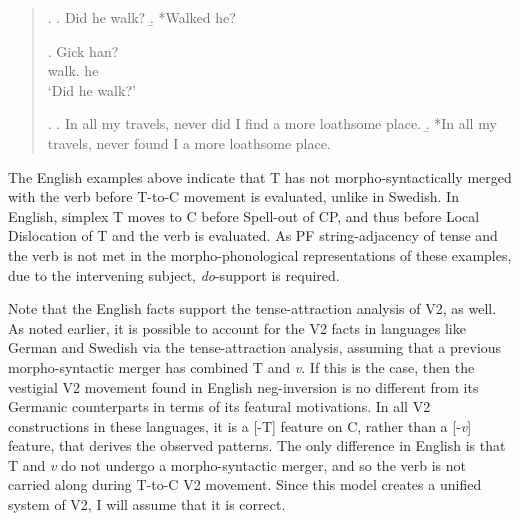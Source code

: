\singlespacing
\begin{quote}
\ex. \label{EnInt}
\a. Did he walk? \label{EnInta}
\b. *Walked he? \label{EnIntb}

\exg. Gick han? \label{SeInt}\\
walk. he\\
`Did he walk?'

\ex. \label{EnNegInv}
\a. \label{EnNegInva} In all my travels, never did I find a more loathsome place.
\b. *In all my travels, never found I a more loathsome place. \label{EnNegInvb}\\

\end{quote}
\onehalfspacing
The English examples above indicate that T has not morpho-syntactically merged with the verb before T-to-C movement is evaluated, unlike in Swedish. In English, simplex T moves to C before Spell-out of CP, and thus before Local Dislocation of T and the verb is evaluated. As PF string-adjacency of tense and the verb is not met in the morpho-phonological representations of these examples, due to the intervening subject, {\it do}-support is required.

Note that the English facts support the tense-attraction analysis of V2, as well. As noted earlier, it is possible to account for the V2 facts in languages like German and Swedish via the tense-attraction analysis, assuming that a previous morpho-syntactic merger has combined T and {\it v}. If this is the case, then the vestigial V2 movement found in English neg-inversion \Last is no different from its Germanic counterparts in terms of its featural motivations. In all V2 constructions in these languages, it is a [-T] feature on C, rather than a [-{\it v}] feature, that derives the observed patterns. The only difference in English is that T and {\it v} do not undergo a morpho-syntactic merger, and so the verb is not carried along during T-to-C V2 movement. Since this model creates a unified system of V2, I will assume that it is correct.

